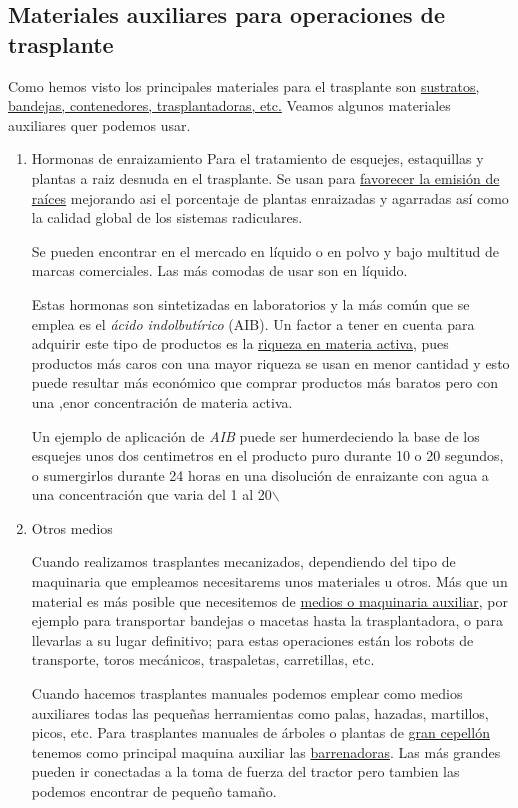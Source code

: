 \documentclass[a4paper,12pt,oneside]{article}
\begin{document}
\subsection{Materiales auxiliares para operaciones de trasplante}
\label{sec:orge518ee7}

Como  hemos visto los principales materiales para el trasplante son
\uline{sustratos, bandejas, contenedores, trasplantadoras, etc.} Veamos algunos
materiales auxiliares quer podemos usar.

\begin{enumerate}
\item Hormonas de enraizamiento
\label{sec:org67a48e7}
Para el tratamiento de esquejes, estaquillas y plantas a raiz desnuda en el
trasplante. Se usan para \uline{favorecer la emisión de raíces} mejorando asi el
porcentaje de plantas enraizadas y agarradas así como la calidad global de los
sistemas radiculares.

Se pueden encontrar en el mercado en líquido o en polvo y bajo multitud de
marcas comerciales. Las más comodas de usar son en líquido.

Estas hormonas son sintetizadas en laboratorios y la más común que se emplea es
el \emph{ácido indolbutírico} (AIB). Un factor a tener en cuenta para adquirir este
tipo de productos es la \uline{riqueza en materia activa}, pues productos más caros
con una mayor riqueza se usan en menor cantidad y esto puede resultar más
económico que comprar productos más baratos pero con una ,enor concentración de
materia activa.

Un ejemplo de aplicación de \emph{AIB} puede ser humerdeciendo la base de los
esquejes unos dos centimetros en el producto puro durante 10 o 20 segundos, o
sumergirlos durante 24 horas en una disolución de enraizante con agua a una
concentración que varia del 1 al 20$\backslash$%

\item Otros medios
\label{sec:orgcd45ebf}

Cuando realizamos trasplantes mecanizados, dependiendo del tipo de maquinaria
que empleamos necesitarems unos materiales u otros. Más que un material es más
posible que necesitemos de \uline{medios o maquinaria auxiliar}, por ejemplo para
transportar bandejas o macetas hasta la trasplantadora, o para llevarlas a su
lugar definitivo; para estas operaciones están los robots de transporte, toros
mecánicos, traspaletas, carretillas, etc.

Cuando hacemos trasplantes manuales podemos emplear como medios auxiliares todas
las pequeñas herramientas como palas, hazadas, martillos, picos, etc. Para
trasplantes manuales de árboles o plantas de \uline{gran cepellón} tenemos como
principal  maquina auxiliar las \uline{barrenadoras}. Las más grandes pueden ir
conectadas a la toma de fuerza del tractor pero tambien las podemos encontrar de
pequeño tamaño.


\end{enumerate}
\end{document}
